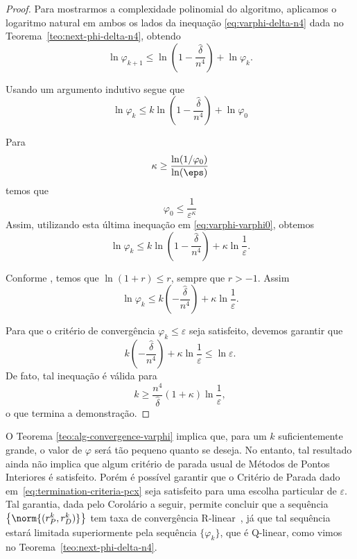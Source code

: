 \begin{proof} Para mostrarmos a complexidade polinomial do algoritmo, aplicamos o logaritmo natural em ambos os lados da inequação \eqref{eq:varphi-delta-n4} dada no Teorema~\ref{teo:next-phi-delta-n4}, obtendo
	\[
	\ln\varphi_{k+1}\leq \ln \left(1 - \frac{\hat{\delta}}{n^{4}}\right) + \ln\varphi_{k}.
	\]

Usando um argumento indutivo  segue que
\begin{equation}\label{eq:varphi-varphi0}
		\ln\varphi_{k} \leq k \ln\left(1 - \frac{\hat{\delta}}{n^{4}}\right) + \ln \varphi_{0} 	
\end{equation}
	

Para 
\[
\kappa \geq \dfrac{\ln(1/\varphi_{0})}{\ln(\eps)}
\] 
temos que 
\[
\varphi_{0}\leq \dfrac{1}{\varepsilon^{\kappa}}
\]
Assim, utilizando esta última inequação em \eqref{eq:varphi-varphi0}, obtemos
\[
\ln\varphi_{k} \leq  k \ln\left(1 - \frac{\hat{\delta}}{n^{4}}\right) + \kappa\ln \frac{1}{\varepsilon}.
\] 

Conforme \textcite[Lema 4.1, p.~68]{Wright:Primal-dual-interior-point:1997h}, temos que $\ln(1+r) \leq r$, sempre que $r>-1$. Assim
\[
	\ln\varphi_{k}\leq k \left(- \frac{\hat{\delta}}{n^{4}}\right) + \kappa\ln \frac{1}{\varepsilon}.
\] 

Para que o critério de convergência $\varphi_{k}\leq\varepsilon$ seja satisfeito, devemos garantir que 
\[
	k \left(- \frac{\hat{\delta}}{n^{4}}\right) + \kappa\ln \frac{1}{\varepsilon} \leq \ln\varepsilon.
\] 
De fato, tal inequação é válida para 
\[
	k \geq \dfrac{n^{4}}{\hat{\delta}}(1+\kappa)\ln\frac{1}{\varepsilon},
\]
o que termina a demonstração.
\end{proof}






O Teorema \ref{teo:alg-convergence-varphi} implica que, para um $k$ suficientemente grande, o valor de $\varphi$ será tão pequeno quanto se deseja. No entanto, tal resultado ainda não implica que algum critério de parada usual de Métodos de Pontos Interiores é satisfeito. Porém é possível garantir que o Critério de Parada dado em~\eqref{eq:termination-criteria-pcx} seja satisfeito para uma escolha particular de $\varepsilon$. Tal garantia, dada pelo Corolário a seguir, permite concluir que a sequência $\left\{\norm{(r_{P}^{k},r_{D}^{k})}\right\}$ tem taxa de convergência R-linear~\cite{Ortega:2000vd}, já que tal sequência estará limitada superiormente pela sequência $\{\varphi_{k}\}$, que é Q-linear, como vimos no Teorema~\ref{teo:next-phi-delta-n4}.

